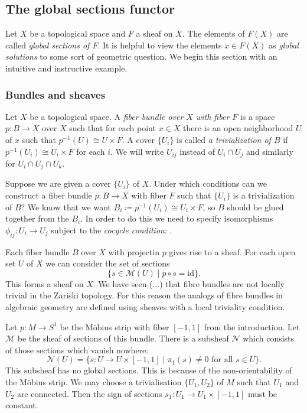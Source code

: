 \subsection{The global sections functor}
Let $X$ be a topological space and $F$ a sheaf on $X$. The elements of $F(X)$ are called \textit{global sections of $F$}. It is helpful to view the elements $x \in F(X)$ as \textit{global solutions} to some sort of geometric question. We begin this section with an intuitive and instructive example.

\subsubsection{Bundles and sheaves}
\begin{definition}
	Let $X$ be a topological space. A \textit{fiber bundle over $X$ with fiber $F$} is a space $p: B \to X$ over $X$ such that for each point $x \in X$ there is an open neighborhood $U$ of $x$ such that $p^{-1}(U) \cong U \times F$. A cover $\{U_i\}$ is called \textit{a trivialization of $B$} if $p^{-1}(U_i) \cong U_i \times F$ for each $i$. We will write $U_{ij}$ instead of $U_i \cap U_j$ and similarly for $U_i \cap U_j \cap U_k$.
\end{definition}
\begin{remark}
	Suppose we are given a cover $\{U_i\}$ of $X$. Under which conditions can we construct a fiber bundle $p: B \to X$ with fiber $F$ such that $\{U_i\}$ is a trivialization of $B$? We know that we want $B_i \coloneqq p^{-1}(U_i)\cong U_i \times F $, so $B$ should be glued together from the $B_i$. In order to do this we need to specify isomorphisms $\phi_{ij} : U_i \to U_j$ subject to the \textit{cocycle condition}:
	.
\end{remark}

\begin{construction}
	Each fiber bundle $B$ over $X$ with projectin $p$ gives rise to a sheaf. For each open set $U$ of $X$ we can consider the set of sections 
	\[
		\{s \in \mathcal{M}(U) \mid p \circ s = \text{id}\}.
	\]
	This forms a sheaf on $X$. We have seen (...) that fibre bundles are not locally trivial in the Zariski topology. For this reason the analogs of fibre bundles in algebraic geometry are defined using sheaves with a local triviality condition.
\end{construction}
\begin{example}
	Let $p : M \to S^1$ be the M\"obius strip with fiber $[-1,1]$ from the introduction. Let $\mathcal{M}$ be the sheaf of sections of this bundle. There is a subsheaf $\mathcal{N}$ which consists of those sections which vanish nowhere:
	\[
		\mathcal{N}(U) = \{s : U \to U \times [-1,1] \mid \pi_1(s) \neq 0 \text{ for all } s \in U\}.
	\]
	This subsheaf has no global sections. This is because of the non-orientability of the M\"obius strip. We may choose a trivialisation $\{U_1, U_2\}$ of $M$ such that $U_1$ and $U_2$ are connected. Then the sign of sections $s_1: U_1 \to U_1 \times [-1,1]$ must be constant.
\end{example}

